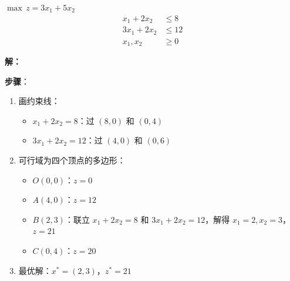 \begin{example}[图解法]
$\max \, z = 3x_1 + 5x_2$
\begin{align*}
x_1 + 2x_2 &\leq 8 \\
3x_1 + 2x_2 &\leq 12 \\
x_1, x_2 &\geq 0
\end{align*}

\textbf{解：}

\textbf{步骤}：
\begin{enumerate}
    \item 画约束线：
    \begin{itemize}
        \item $x_1 + 2x_2 = 8$：过 $(8,0)$ 和 $(0,4)$
        \item $3x_1 + 2x_2 = 12$：过 $(4,0)$ 和 $(0,6)$
    \end{itemize}
    \item 可行域为四个顶点的多边形：
    \begin{itemize}
        \item $O(0,0)$：$z = 0$
        \item $A(4,0)$：$z = 12$
        \item $B(2,3)$：联立 $x_1+2x_2=8$ 和 $3x_1+2x_2=12$，解得 $x_1=2, x_2=3$，$z = 21$
        \item $C(0,4)$：$z = 20$
    \end{itemize}
    \item 最优解：$x^* = (2, 3)$，$z^* = 21$
\end{enumerate}
\end{example}

